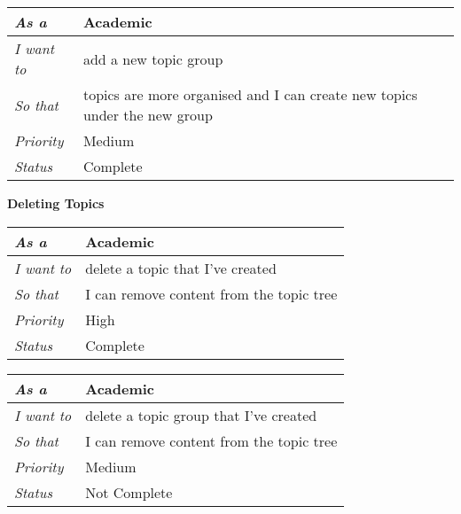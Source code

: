 \begin{table}[hp]
\begin{tabular}{|l|l|}
\hline
\textit{As a}      & Academic                                                                      \\ \hline
\textit{I want to} & add a new topic group                                                     \\ \hline
\textit{So that}   & topics are more organised and I can create new topics under the new group \\ \hline
\textit{Priority}  & {\color[HTML]{F8A102} Medium}                                             \\ \hline
\textit{Status}    & Complete                                                                  \\ \hline
\end{tabular}
\end{table}

\textbf{Deleting Topics}

\begin{table}[hp]
\begin{tabular}{|l|l|}
\hline
\textit{As a}      & Academic                                 \\ \hline
\textit{I want to} & delete a topic that I've created         \\ \hline
\textit{So that}   & I can remove content from the topic tree \\ \hline
\textit{Priority}  & {\color[HTML]{FE0000} High}              \\ \hline
\textit{Status}    & Complete                                 \\ \hline
\end{tabular}
\end{table}

\begin{table}[hp]
\begin{tabular}{|l|l|}
\hline
\textit{As a}      & Academic                                 \\ \hline
\textit{I want to} & delete a topic group that I've created   \\ \hline
\textit{So that}   & I can remove content from the topic tree \\ \hline
\textit{Priority}  & {\color[HTML]{F8A102} Medium}              \\ \hline
\textit{Status}    & Not Complete                                 \\ \hline
\end{tabular}
\end{table}

